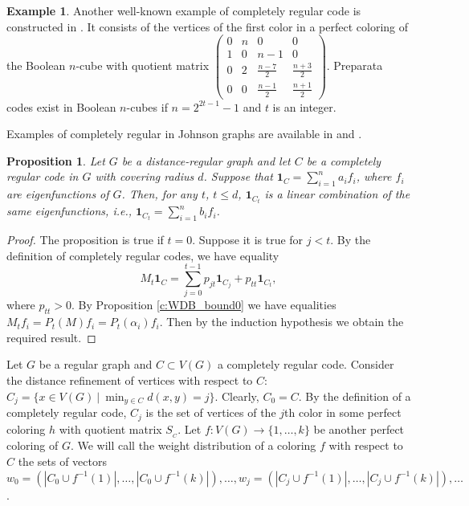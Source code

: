 \documentclass[11pt]{article}
\newtheorem{claim}{Proposition}[section]
\theoremstyle{definition}
\newtheorem{example}{Example}[section]
\begin{document}
{{{{
\begin{example}\label{ex:face1}
Another well-known example of completely regular code is constructed in \cite{CCZ}. It consists of the vertices of the first color in a perfect
coloring of the Boolean $n$-cube with quotient matrix $\begin{pmatrix}
0 & n & 0 & 0 \\
1 & 0 & n-1 & 0\\
0 & 2 &\frac{n-7}{2} & \frac{n+3}{2}\\
0 & 0 & \frac{n-1}{2} & \frac{n+1}{2}
\end{pmatrix}$. Preparata codes exist in Boolean $n$-cubes  if
 $n=2^{2t-1}-1$ and $t$ is an integer.
\end{example}}


Examples of completely regular in Johnson graphs are available in \cite{AM10} and \cite{AM11}.



\begin{claim}\label{c:compl_reg_code_color}
Let $G$ be a distance-regular graph and let $C$ be  a completely
regular code in $G$ with covering radius $d$. Suppose that   ${\mathbf 1}_{C}=\sum\limits_{i=1}^n a_i f_i$, where  $f_i$ are  eigenfunctions of $G$.  Then, for any $t$,
$t\leq d$, ${\mathbf 1}_{C_t}$ is a linear combination of the same eigenfunctions, i.e.,
${\mathbf 1}_{C_t}=\sum\limits_{i=1}^n b_i f_i$.
\end{claim}
\begin{proof}
The proposition is true if $t=0$.  Suppose it is true for $j<t$. By the definition of  completely
regular codes, we have equality  $$M_t{\mathbf 1}_{C}=\sum\limits_{j=0}^{t-1}p_{jt}{\mathbf 1}_{C_j}+p_{tt}{\mathbf 1}_{C_t},$$
where $p_{tt}>0$.
By Proposition \ref{c:WDB_bound0} we have equalities
$M_tf_i=P_t(M)f_i=P_t(\alpha_i)f_i$. Then by the induction hypothesis  we obtain the required result. \end{proof}

Let $G$ be a regular graph and $C\subset V(G)$
a completely regular code. Consider the distance refinement of vertices with respect to
$C$: $C_j=\{x\in V(G) \ |\ \min_{y\in C}
d(x,y)=j\}$. Clearly, $C_0=C$. By the definition of a completely regular
code, $C_j$ is the set of vertices of the $j$th color in some perfect
coloring $h$ with quotient matrix $S_{_C}$. Let
$f:V(G)\rightarrow \{1,\dots,k\}$
be another perfect coloring of $G$. We will call the weight
distribution of a coloring $f$ with respect to $C$ the sets of vectors
$w_0=(|C_0\cup f^{-1}(1)|,\dots, |C_0\cup f^{-1}(k)|),\dots,
w_j=(|C_j\cup f^{-1}(1)|,\dots, |C_j\cup f^{-1}(k)|),\dots$.}

}}
\end{document}
